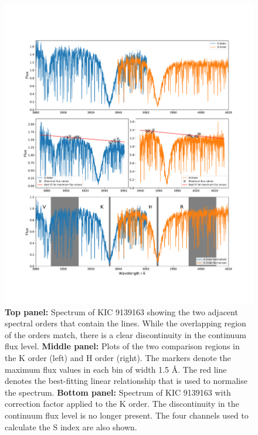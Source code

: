 \begin{figure}
    \centering
    \includegraphics[scale=0.40]{Figures/4-Chromospheric_age/kic9139163_example.pdf}
    \caption[Example of optical spectra in \caII region and the normalisation method]{\textbf{Top panel:} Spectrum of KIC 9139163 showing the two adjacent spectral orders that contain the \caII lines. While the overlapping region of the orders match, there is a clear discontinuity in the continuum flux level.
    \textbf{Middle panel:} Plots of the two comparison regions in the K order (left) and H order (right). The markers denote the maximum flux values in each bin of width 1.5 \AA. The red line denotes the best-fitting linear relationship that is used to normalise the spectrum.
    \textbf{Bottom panel:} Spectrum of KIC 9139163 with correction factor applied to the K order. The discontinuity in the continuum flux level is no longer present. The four channels used to calculate the S index are also shown.}
    \label{fig:normlisation_example}
\end{figure}


